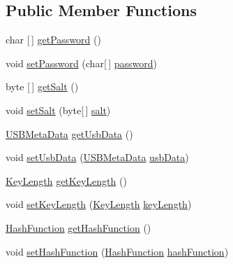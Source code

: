 \subsection*{Public Member Functions}
\begin{DoxyCompactItemize}
\item 
char \mbox{[}$\,$\mbox{]} \mbox{\hyperlink{classpersistence_1_1_meta_data_ab1931de4f8e78975c63262181a054de2}{get\+Password}} ()
\item 
void \mbox{\hyperlink{classpersistence_1_1_meta_data_aa1768eb02bec3fc914c741c50574ef80}{set\+Password}} (char\mbox{[}$\,$\mbox{]} \mbox{\hyperlink{classpersistence_1_1_meta_data_a4580678ad37f2d5dcd6bc80761a97bad}{password}})
\item 
byte \mbox{[}$\,$\mbox{]} \mbox{\hyperlink{classpersistence_1_1_meta_data_ab65ed5e7f5b5b0ea1a993f00116e4d54}{get\+Salt}} ()
\item 
void \mbox{\hyperlink{classpersistence_1_1_meta_data_a5fc10b0100b0ba35fdcd9806c0dd2486}{set\+Salt}} (byte\mbox{[}$\,$\mbox{]} \mbox{\hyperlink{classpersistence_1_1_meta_data_af5566fbfbb66a3605578bb3524a701a4}{salt}})
\item 
\mbox{\hyperlink{classpersistence_1_1_u_s_b_meta_data}{U\+S\+B\+Meta\+Data}} \mbox{\hyperlink{classpersistence_1_1_meta_data_a465f5b971663fa5082d3ce35fe724cc0}{get\+Usb\+Data}} ()
\item 
void \mbox{\hyperlink{classpersistence_1_1_meta_data_a5fdfe20c91b05af14d85f778b4862962}{set\+Usb\+Data}} (\mbox{\hyperlink{classpersistence_1_1_u_s_b_meta_data}{U\+S\+B\+Meta\+Data}} \mbox{\hyperlink{classpersistence_1_1_meta_data_a703608d838972ff752e7e78f8cb0cbe2}{usb\+Data}})
\item 
\mbox{\hyperlink{enumenums_1_1_key_length}{Key\+Length}} \mbox{\hyperlink{classpersistence_1_1_meta_data_a722b4ec15cf49c53bc490fd1d8df8ec5}{get\+Key\+Length}} ()
\item 
void \mbox{\hyperlink{classpersistence_1_1_meta_data_aaf05e483e99e40220abf10a3393b139d}{set\+Key\+Length}} (\mbox{\hyperlink{enumenums_1_1_key_length}{Key\+Length}} \mbox{\hyperlink{classpersistence_1_1_meta_data_ae6b0f8f276c22bca3d79628131e2b274}{key\+Length}})
\item 
\mbox{\hyperlink{enumenums_1_1_hash_function}{Hash\+Function}} \mbox{\hyperlink{classpersistence_1_1_meta_data_ae8277092237f4c1d94b633ecc4c3c9f8}{get\+Hash\+Function}} ()
\item 
void \mbox{\hyperlink{classpersistence_1_1_meta_data_af1f325cf458c6a034428dca9fb74e2cc}{set\+Hash\+Function}} (\mbox{\hyperlink{enumenums_1_1_hash_function}{Hash\+Function}} \mbox{\hyperlink{classpersistence_1_1_meta_data_abefaf99931c3284bf4d069ff253ec714}{hash\+Function}})

\end{DoxyCompactItemize}
